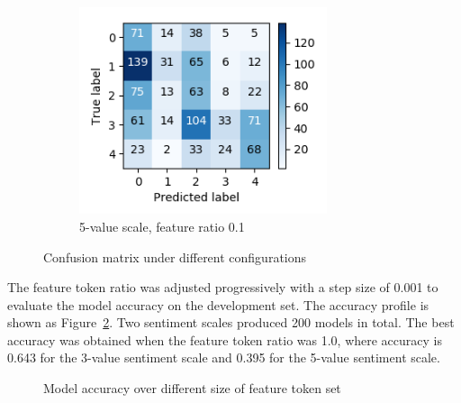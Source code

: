 \documentclass[11pt,a4paper]{article}
\begin{document}
\begin{figure}[ht]
\begin{subfigure}[t]{0.3\textwidth}
        \includegraphics[width=0.8\textwidth]{images/cm5_0.1.png}
        \caption{5-value scale, feature ratio 0.1}
    \end{subfigure}\label{fig:cm501}
    \caption{Confusion matrix under different configurations}\label{fig:cm}
\end{figure}

The feature token ratio was adjusted progressively with a step size of 0.001 to evaluate the model accuracy on the development set. The accuracy profile is shown as Figure~\ref{fig:ratio}. Two sentiment scales produced 200 models in total. The best accuracy was obtained when the feature token ratio was 1.0, where accuracy is 0.643 for the 3-value sentiment scale and 0.395 for the 5-value sentiment scale.

\begin{figure}[ht]
    \centering
    \caption{Model accuracy over different size of feature token set}\label{fig:ratio}
\end{figure}
\end{document}
